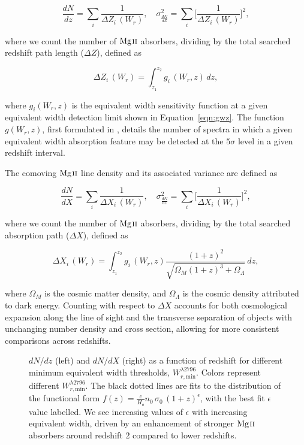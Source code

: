 \documentclass[iop,apj,numberedappendix,appendixfloats,twocolappendix]{emulateapj}
\begin{document}
\begin{equation}
\frac{d N}{d z} = \sum_{i}\frac{1}{\Delta Z_i\,(W_r)},\quad \sigma^2_{\frac{d N}{d Z}} = \sum_{i} \Big[\frac{1}{\Delta Z_i\,(W_r)}\Big]^2,
\label{eqn:dndz}
\end{equation}

\noindent
where we count the number of ${\hbox{{\rm Mg}\kern 0.1em{\sc ii}}}$ absorbers, dividing by the total searched redshift path length ($\Delta Z$), defined as

\begin{equation}
\Delta Z_i\,(W_r) = \int_{z_1}^{z_2} g_i\,(W_r, z)\,dz,
\label{eqn:deltaz}
\end{equation}

\noindent
where $g_i(W_r, z)$ is the equivalent width sensitivity function at a given equivalent width detection limit shown in Equation~\ref{eqn:gwz}. The function $g(W_r, z)$, first formulated in \cite{Lanzetta1987}, details the number of spectra in which a given equivalent width absorption feature may be detected at the $5\sigma$ level in a given redshift interval. 

The comoving ${\hbox{{\rm Mg}\kern 0.1em{\sc ii}}}$ line density and its associated variance are defined as

\begin{equation}
\frac{d N}{d X} = \sum_{i}\frac{1}{\Delta X_i\,(W_r)},\quad \sigma^2_{\frac{d N}{d z}} = \sum_{i} \Big[\frac{1}{\Delta X_i\,(W_r)}\Big]^2,
\label{eqn:dndx}
\end{equation}

\noindent
where we count the number of ${\hbox{{\rm Mg}\kern 0.1em{\sc ii}}}$ absorbers, dividing by the total searched absorption path ($\Delta X$), defined as

\begin{equation}
\Delta X_i\,(W_r) = \int_{z_1}^{z_2} g_i\,(W_r, z) \frac{(1 + z)^2}{\sqrt{\Omega_M (1 + z)^3 + \Omega_{\Lambda}}}\,dz,
\label{eqn:deltax}
\end{equation}

\noindent
where $\Omega_M$ is the cosmic matter density, and $\Omega_{\Lambda}$ is the cosmic density attributed to dark energy. Counting with respect to $\Delta X$ accounts for both cosmological expansion along the line of sight and the transverse separation of objects with unchanging number density and cross section, allowing for more consistent comparisons across redshifts. 


\begin{figure*}[bth]
\caption{$dN\!/dz$ (left) and $dN\!/dX$ (right) as a function of redshift for different minimum equivalent width thresholds, $W_{r,\mathrm{min}}^{\lambda2796}$. Colors represent different $W_{r,\mathrm{min}}^{\lambda2796}$. The black dotted lines are fits to the distribution of the functional form $f(z) = \frac{c}{H_o} n_0\,\sigma_0\,(1 + z)^{\epsilon}$, with the best fit $\epsilon$ value labelled. We see increasing values of $\epsilon$ with increasing equivalent width, driven by an enhancement of stronger ${\hbox{{\rm Mg}\kern 0.1em{\sc ii}}}$ absorbers around redshift 2 compared to lower redshifts.}
\label{fig:dndz_dndx}
\end{figure*}
\end{document}
